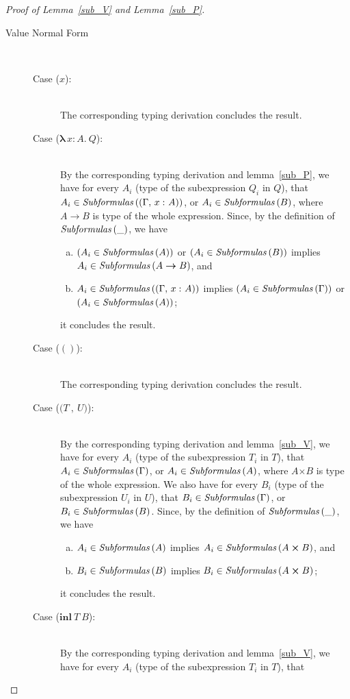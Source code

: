 \documentclass[a4paper]{article}
\newcommand{\typecolor}{}
\newcommand{\termcolor}{}
\newcommand{\tp}[1]{{\typecolor #1}}
\newcommand{\tm}[1]{{\termcolor #1}}
\newcommand{\typarr}[2]{#1\boldsymbol{\rightarrow}#2}
\newcommand{\typprd}[2]{#1\boldsymbol{\times}#2}
\newcommand{\expvar}[1]{#1}
\newcommand{\expunt}{\boldsymbol{()}}
\newcommand{\expabs}[3]{\boldsymbol{\lambda}\,#1\boldsymbol{\colon}#2\boldsymbol{.}\ #3}
\newcommand{\expprd}[2]{\boldsymbol{(}#1\ \boldsymbol{,}\ #2\boldsymbol{)}}
\newcommand{\explft}[2]{\mathbf{inl}\ #1\ #2}
\newcommand{\typing}[2]{\tm{#1:\ }\tp{#2}}
\newcommand{\typenvcon}[2]{\tp{\Gamma,}\ \typing{#1}{#2}}
\newcommand{\txt}[1]{\text{\textit{#1}}}
\newcommand{\subformulas}[1]{\txt{Subformulas}\,(#1)}
\begin{document}
\begin{proof}[Proof of Lemma~\ref{sub_V} and Lemma~\ref{sub_P}]
\begin{description}
\item[Value Normal Form]\ \\
\begin{description}
\item[Case ($\expvar{x}$):]\ \\ 
  The corresponding typing derivation concludes the result. 
\item[Case ($\expabs{x}{A}{Q}$):]\ \\ 
  By the corresponding typing derivation and lemma~\ref{sub_P}, we
  have for every $A_i$ (type of the subexpression $Q_i$ in $Q$), that
  $A_i \in \subformulas{(\typenvcon{x}{A})}$, or $A_i \in
  \subformulas{B}$, where $\typarr{A}{B}$ is type of the whole
  expression. Since, by the definition of $\subformulas{\_}$, we have
  \begin{enumerate}[(a)] 
     \item $(A_i \in \subformulas{A})$ or $(A_i \in \subformulas{B})$ implies $A_i \in \subformulas{\typarr{A}{B}}$, and
     \item $A_i \in \subformulas{(\typenvcon{x}{A})}$ implies $(A_i \in \subformulas{\Gamma})$ or $(A_i \in \subformulas{A})$;
  \end{enumerate}
  it concludes the result.
\item[Case ($\expunt$):]\ \\ 
  The corresponding typing derivation concludes the result. 
\item[Case ($\expprd{T}{U}$):]\ \\ 
  By the corresponding typing derivation and lemma~\ref{sub_V}, we
  have for every $A_i$ (type of the subexpression $T_i$ in $T$), that
  $A_i \in \subformulas{\Gamma}$, or $A_i \in \subformulas{A}$, where
  $\typprd{A}{B}$ is type of the whole expression. We also have for
  every $B_i$ (type of the subexpression $U_i$ in $U$), that $B_i \in
  \subformulas{\Gamma}$, or $B_i \in \subformulas{B}$. Since, by the
  definition of $\subformulas{\_}$, we have
  \begin{enumerate}[(a)] 
     \item $A_i \in \subformulas{A}$ implies $A_i \in \subformulas{\typprd{A}{B}}$, and
     \item $B_i \in \subformulas{B}$ implies $B_i \in \subformulas{\typprd{A}{B}}$;
  \end{enumerate}
  it concludes the result.
\item[Case ($\explft{T}{B}$):]\ \\
  By the corresponding typing derivation and lemma~\ref{sub_V}, we
  have for every $A_i$ (type of the subexpression $T_i$ in $T$), that

\end{description}
\end{description}
\end{proof}
\end{document}
